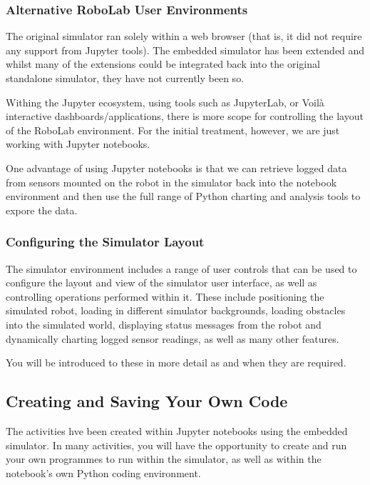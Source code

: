\documentclass[letterpaper,10pt,english]{sphinxmanual}
\begin{document}
\subsubsection{Alternative RoboLab User Environments}
\label{\detokenize{content/00_READ_ME_FIRST/Section_00_06_RoboLab_Environment:Alternative-RoboLab-User-Environments}}
The original  simulator ran solely within a web browser (that is, it did not require any support from Jupyter tools). The embedded simulator has been extended and whilst many of the extensions could be integrated back into the original standalone simulator, they have not currently been so.

Withing the Jupyter ecosystem, using tools such as JupyterLab, or Voilà interactive dashboards/applications, there is more scope for controlling the layout of the RoboLab environment. For the initial treatment, however, we are just working with Jupyter notebooks.

One advantage of using Jupyter notebooks is that we can retrieve logged data from sensors mounted on the robot in the simulator back into the notebook environment and then use the full range of Python charting and analysis tools to expore the data.


\subsubsection{Configuring the Simulator Layout}
\label{\detokenize{content/00_READ_ME_FIRST/Section_00_06_RoboLab_Environment:Configuring-the-Simulator-Layout}}
The simulator environment includes a range of user controls that can be used to configure the layout and view of the simulator user interface, as well as controlling operations performed within it. These include positioning the simulated robot, loading in different simulator backgrounds, loading obstacles into the simulated world, displaying status messages from the robot and dynamically charting logged sensor readings, as well as many other features.

You will be introduced to these in more detail as and when they are required.


\subsection{Creating and Saving Your Own Code}
\label{\detokenize{content/00_READ_ME_FIRST/Section_00_06_RoboLab_Environment:Creating-and-Saving-Your-Own-Code}}
The activities hve been created within Jupyter notebooks using the embedded simulator. In many activities, you will have the opportunity to create and run your own programmes to run within the simulator, as well as within the notebook’s own Python coding environment.
\end{document}

